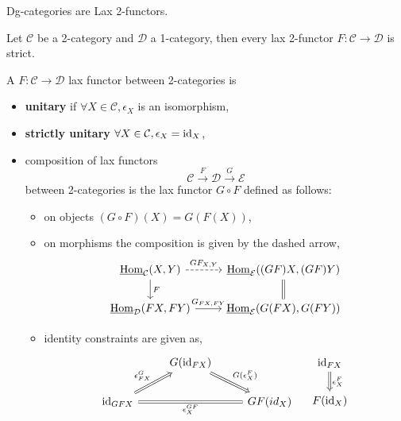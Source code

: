 \begin{rmk}
	Dg-categories are Lax 2-functors.
\end{rmk}	

\begin{Exercise}
	Let $ \mathcal{ C } $ be a 2-category and $ \mathcal{ D } $ a 1-category, then every lax 2-functor $ F \colon  \mathcal{ C } \to \mathcal{ D } $ is strict.
\end{Exercise}

\begin{defi}
	A $ F \colon \mathcal{ C } \to \mathcal{ D } $ lax functor between 2-categories is 
	\begin{itemize}
		\item 
		\textbf{unitary} if $  \forall X \in \mathcal{ C } , \epsilon_X $ is an isomorphism,
		
		\item 
		\textbf{strictly unitary} $ \forall X \in \mathcal{ C } , \epsilon_X = \operatorname{id}_X $,
		
		\item 
		composition of lax functors
		\[
			\mathcal{ C } \xrightarrow{ F } 
			\mathcal{ D } \xrightarrow{ G } 
			\mathcal{ E }
		\]  
		between 2-categories is the lax functor $ G \circ F $ defined as follows:
		
		\begin{itemize}
			\item 
			on objects $( G \circ F ) ( X ) = G ( F ( X ) )$,
			
			\item 
			on morphisms the composition is given by the dashed arrow,
			\[
			\begin{tikzcd}
				\underline{ \Hom }_{ \mathcal{ C } } ( X , Y )
				\ar[r, dashed, "GF_{ X , Y } "]
				\ar[d, " F "]
				&
				\underline{ \Hom }_{ \mathcal{ E } } ( ( G F ) X , ( G F ) Y )
				\ar[d, equal]
				\\
				\underline{ \Hom }_{ \mathcal{ D } } ( F X , F Y )
				\ar[r, "G_{ F X , F Y }"]
				&
				\underline{\Hom}_{\mathcal{ E } } ( G ( F X ), G ( F Y ) )   
			\end{tikzcd}
			\]
			
			\item 
			identity constraints are given as,
			\[
			\begin{tikzcd}
				&G ( \id_{ F X } )
				\ar[rd, Rightarrow, " G ( \epsilon_X^F) "]
				\\
				\id_{ G F X }
				\ar[ru, Rightarrow, " \epsilon_{ F X }^G"]
				\ar[rr, Rightarrow, equal, " \epsilon_X^{ G F }"']
				&&
				GF ( id_X )
			\end{tikzcd}
			\quad 
			\begin{tikzcd}		
				\id_{ F X }
				\ar[d, Rightarrow, "\epsilon_X^F"]
				\\
				F ( \id_X ) 
			\end{tikzcd}
			\]
			

\end{itemize}
\end{itemize}
\end{defi}
